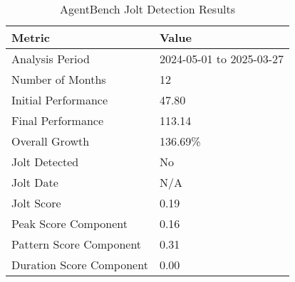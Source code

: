 
\begin{table}[ht]
\centering
\caption{AgentBench Jolt Detection Results}
\label{tab:agentbench_jolt}
\begin{tabular}{ll}
\toprule
\textbf{Metric} & \textbf{Value} \\
\midrule
Analysis Period & 2024-05-01 to 2025-03-27 \\
Number of Months & 12 \\
Initial Performance & 47.80 \\
Final Performance & 113.14 \\
Overall Growth & 136.69\% \\
\midrule
Jolt Detected & No \\
Jolt Date & N/A \\
Jolt Score & 0.19 \\
\midrule
Peak Score Component & 0.16 \\
Pattern Score Component & 0.31 \\
Duration Score Component & 0.00 \\
\bottomrule
\end{tabular}
\end{table}
